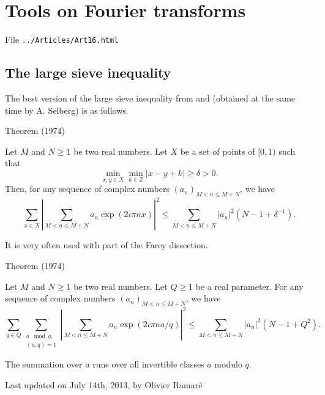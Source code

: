 \chapter{  Tools on Fourier transforms}

File \texttt{../Articles/Art16.html}










\section{The large sieve inequality
}


The best version of the large sieve inequality from
\cite{Montgomery-Vaughan*74}
and
\cite{Montgomery-Vaughan*73}
(obtained at the same time by A. Selberg) is as follows.

\begin{thm}{Theorem (1974)}

Let $M$ and $N\ge 1$ be two real numbers. Let $X$ be a set of points of
$[0,1)$ such that 
$$
\min_{x,y\in X}\min_{k\in\mathbb{Z}}|x-y+k|\ge \delta>0.
$$
Then, for any sequence of complex numbers $(a_n)_{M < n\le M+N}$, we have
$$
\sum_{x\in X}\left|
\sum_{M < n\le M+N} a_n \exp(2i\pi nx)
\right|^2
\le \sum_{M < n\le M+N}|a_n|^2 (N-1+\delta^{-1}).
$$
\end{thm}


It is very often used with part of the Farey dissection.

\begin{thm}{Theorem (1974)}

Let $M$ and $N\ge 1$ be two real numbers. Let $Q\ge1$ be a real parameter.
For any sequence of complex numbers $(a_n)_{M < n\le M+N}$, we have
$$
\sum_{q\in Q}\sum_{\substack{a\mod q,\\ (a,q)=1}}\left|
\sum_{M < n\le M+N} a_n \exp(2i\pi na/q)
\right|^2
\le \sum_{M < n\le M+N}|a_n|^2 (N-1+Q^2).
$$
\end{thm}

The summation over $a$ runs over all invertible classes $a$ modulo $q$.


 
 








  
  Last updated on July 14th, 2013, by Olivier Ramar\'e
















